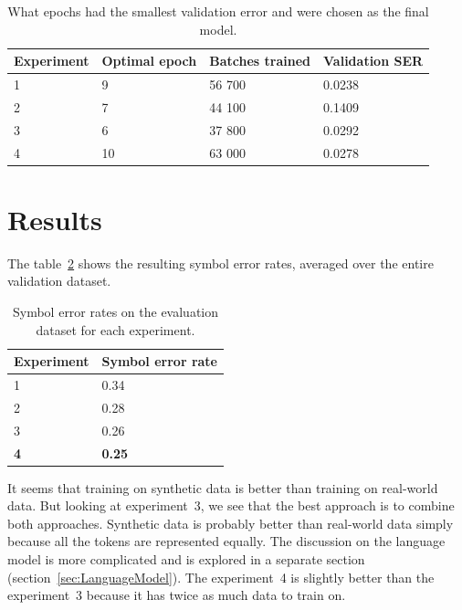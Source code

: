 \begin{table}[h] \centering
    \begin{tabular}{llll}
    \toprule
    \textbf{Experiment} & \textbf{Optimal epoch} & \textbf{Batches trained} & \textbf{Validation SER} \\
    \midrule
    1 & 9  & 56 700 & 0.0238 \\
    2 & 7  & 44 100 & 0.1409 \\
    3 & 6  & 37 800 & 0.0292 \\
    4 & 10 & 63 000 & 0.0278 \\
    \bottomrule
    \end{tabular}
    \caption{What epochs had the smallest validation error and were chosen as the final model.}
    \label{tab6:OptimalEpochs}
\end{table}

\newpage


\section{Results}
\label{sec:Results}

The table~\ref{tab6:ExperimentSER} shows the resulting symbol error rates, averaged over the entire validation dataset.

\begin{table}[h] \centering
\begin{tabular}{ll}
\toprule
\textbf{Experiment} & \textbf{Symbol error rate} \\
\midrule
1 & 0.34 \\
2 & 0.28 \\
3 & 0.26 \\
\textbf{4} & \textbf{0.25} \\
\bottomrule
\end{tabular}
\caption{Symbol error rates on the evaluation dataset for each experiment.}
\label{tab6:ExperimentSER}
\end{table}

It seems that training on synthetic data is better than training on real-world data. But looking at experiment~3, we see that the best approach is to combine both approaches. Synthetic data is probably better than real-world data simply because all the tokens are represented equally. The discussion on the language model is more complicated and is explored in a separate section (section~\ref{sec:LanguageModel}). The experiment~4 is slightly better than the experiment~3 because it has twice as much data to train on.

